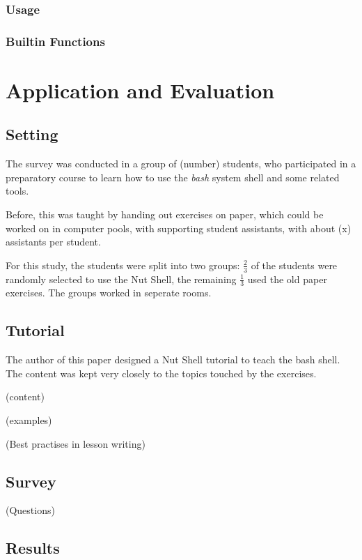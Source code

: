 \documentclass[twoside]{scrreprt}
\begin{document}
\subsection{Usage}

\subsection{Builtin Functions}

\chapter{Application and Evaluation}

\section{Setting}

The survey was conducted in a group of (number) students, who participated in a preparatory course to learn how to use the \emph{bash} system shell and some related tools.

Before, this was taught by handing out exercises on paper, which could be worked on in computer pools, with supporting student assistants, with about (x) assistants per student.

For this study, the students were split into two groups: $\frac{2}{3}$ of the students were randomly selected to use the Nut Shell, the remaining $\frac{1}{3}$ used the old paper exercises. The groups worked in seperate rooms.

\section{Tutorial}

The author of this paper designed a Nut Shell tutorial to teach the bash shell. The content was kept very closely to the topics touched by the exercises.

(content)

(examples)

(Best practises in lesson writing)

\section{Survey}

(Questions)

\section{Results}
\end{document}
